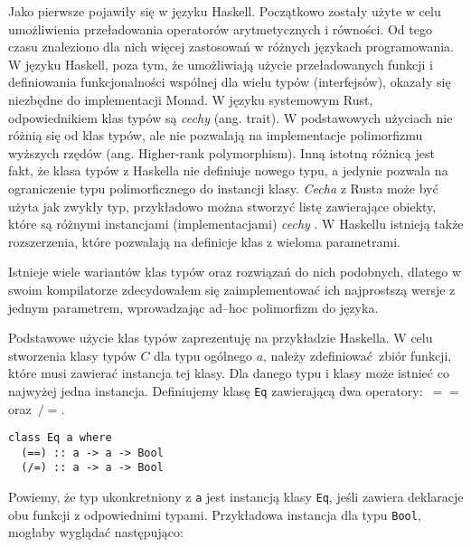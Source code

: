 \documentclass[declaration,shortabstract]{iithesis}
\begin{document}

Jako pierwsze pojawiły się w języku Haskell\cite{tc_wiki}. 
Początkowo zostały użyte w celu umożliwienia przeładowania operatorów 
arytmetycznych i równości. Od tego czasu
znaleziono dla nich więcej zastosowań w różnych językach programowania. W języku
Haskell, poza tym, że umożliwiają użycie przeładowanych funkcji i definiowania 
funkcjonalności wspólnej dla wielu typów (interfejsów), okazały się niezbędne 
do implementacji Monad. W języku systemowym Rust, odpowiednikiem klas typów są
\textit{cechy} (ang. trait). W podstawowych użyciach nie różnią się od klas typów, ale 
nie pozwalają na implementacje polimorfizmu wyższych rzędów 
\cite{no_hkt_in_rust} (ang. 
Higher-rank polymorphism). Inną istotną różnicą jest fakt, że klasa typów z 
Haskella nie definiuje nowego typu, a jedynie pozwala na ograniczenie typu
polimorficznego do 
instancji klasy. \textit{Cecha} z Rusta może być użyta jak zwykły typ, przykładowo 
można stworzyć listę zawierające obiekty, które są różnymi instancjami 
(implementacjami) \textit{cechy} \cite{traits_as_obj_rust}. 
W Haskellu istnieją także rozszerzenia, które 
pozwalają na definicje klas z wieloma parametrami. 


Istnieje wiele wariantów klas typów oraz rozwiązań do nich podobnych, dlatego w swoim 
kompilatorze zdecydowałem się zaimplementować ich najprostszą wersje z jednym 
parametrem, wprowadzając ad--hoc polimorfizm do języka.

Podstawowe użycie klas typów zaprezentuję na przykładzie Haskella. 
W celu stworzenia klasy typów $C$ dla typu ogólnego $a$, należy 
zdefiniować zbiór funkcji, które musi zawierać instancja tej klasy. Dla danego 
typu i klasy może istnieć co najwyżej jedna instancja. 
Definiujemy klasę \texttt{Eq} zawierającą dwa operatory:~$==$ oraz~$/=$.
\begin{lstlisting}[frame=lines]
class Eq a where
  (==) :: a -> a -> Bool
  (/=) :: a -> a -> Bool
\end{lstlisting}

Powiemy, że typ ukonkretniony z \texttt{a} jest instancją klasy \texttt{Eq}, 
jeśli zawiera deklaracje obu funkcji z odpowiednimi typami. Przykładowa 
instancja dla typu \texttt{Bool}, mogłaby wyglądać następująco:
\end{document}
